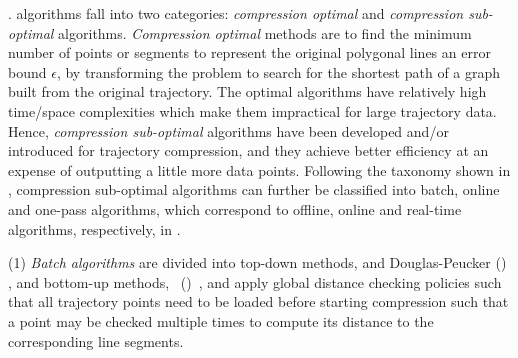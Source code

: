 

. \lsa algorithms fall into two categories: \textit{compression optimal} and \textit{compression sub-optimal} algorithms.
\textit{Compression optimal} methods \cite{Imai:Optimal,Chan:Optimal} are to find the minimum number of points or segments to represent the original polygonal lines \wrt an error bound $\epsilon$, by transforming the problem to search for the shortest path of a graph built from the original trajectory.
The optimal \lsa algorithms have relatively high time/space complexities which make them impractical for large trajectory data.
Hence, \textit{compression sub-optimal} algorithms have been developed and/or introduced for trajectory compression, and they achieve better efficiency at an expense of outputting a little more data points. {Following the taxonomy shown in \cite{Lange:Tracking, Lin:Operb, Lin:Cised}}, compression sub-optimal algorithms can further be classified into batch, online and one-pass algorithms, {which correspond to offline, online and real-time algorithms, respectively, in \cite{Lange:Tracking}}.

\sstab (1) {\em Batch algorithms} are divided into top-down methods, \eg {} and Douglas-Peucker (\dpa) \cite{Douglas:Peucker,Meratnia:Spatiotemporal}, and bottom-up methods, \eg\ \pavlidis (\tpa)~\cite{Pavlidis:Segment}, and apply global distance checking policies such that all trajectory points need to be loaded before starting compression such that a point may be checked multiple times to compute its distance to the corresponding line segments.

